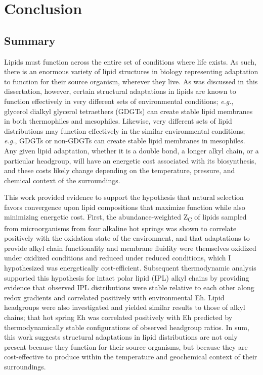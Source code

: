 \chapter[CONCLUSION]{Conclusion}

\section{Summary}

Lipids must function across the entire set of conditions where life exists. As such, there is an enormous variety of lipid structures in biology representing adaptation to function for their source organism, wherever they live. As was discussed in this dissertation, however, certain structural adaptations in lipids are known to function effectively in very different sets of environmental conditions; \textit{e.g.}, glycerol dialkyl glycerol tetraethers (GDGTs) can create stable lipid membranes in both thermophiles and mesophiles. Likewise, very different sets of lipid distributions may function effectively in the similar environmental conditions; \textit{e.g.}, GDGTs or non-GDGTs can create stable lipid membranes in mesophiles. Any given lipid adaptation, whether it is a double bond, a longer alkyl chain, or a particular headgroup, will have an energetic cost associated with its biosynthesis, and these costs likely change depending on the temperature, pressure, and chemical context of the surroundings.

This work provided evidence to support the hypothesis that natural selection favors convergence upon lipid compositions that maximize function while also minimizing energetic cost. First, the abundance-weighted Z\textsubscript{C} of lipids sampled from microorganisms from four alkaline hot springs was shown to correlate positively with the oxidation state of the environment, and that adaptations to provide alkyl chain functionality and membrane fluidity were themselves oxidized under oxidized conditions and reduced under reduced conditions, which I hypothesized was energetically cost-efficient. Subsequent thermodynamic analysis supported this hypothesis for intact polar lipid (IPL) alkyl chains by providing evidence that observed IPL distributions were stable relative to each other along redox gradients and correlated positively with environmental Eh. Lipid headgroups were also investigated and yielded similar results to those of alkyl chains; that hot spring Eh was correlated positively with Eh predicted by thermodynamically stable configurations of observed headgroup ratios. In sum, this work suggests structural adaptations in lipid distributions are not only present because they function for their source organisms, but because they are cost-effective to produce within the temperature and geochemical context of their surroundings.

